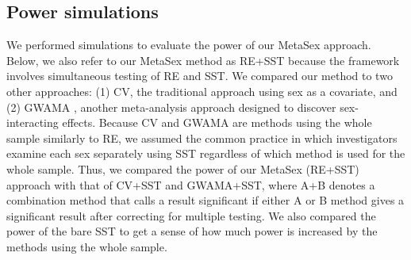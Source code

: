 \documentclass[11pt]{article}
\begin{document}
\subsection{Power simulations}





We performed simulations to evaluate the power of our MetaSex approach. 
Below, we also refer to our MetaSex method as RE+SST 
because the framework involves simultaneous testing of RE and SST.
We compared our method to two other approaches:
(1) CV, the traditional approach using sex as a covariate, 
 and (2) GWAMA \citep{Magi:GenetEpidemiol:2010}, another meta-analysis approach designed to discover 
sex-interacting effects.
Because CV and GWAMA are methods using the whole sample similarly to RE, 
we assumed the 
common practice in which investigators examine each sex separately using SST regardless of which method is used for the whole sample.
Thus, we compared the power of our MetaSex (RE+SST) approach with that of CV+SST and GWAMA+SST,
where A+B denotes a combination method that calls a result significant 
if either A or B method gives a significant result
after correcting for multiple testing.
We also compared the power of the bare SST to get a sense of how much power is increased by the methods using the whole sample.
\end{document}
